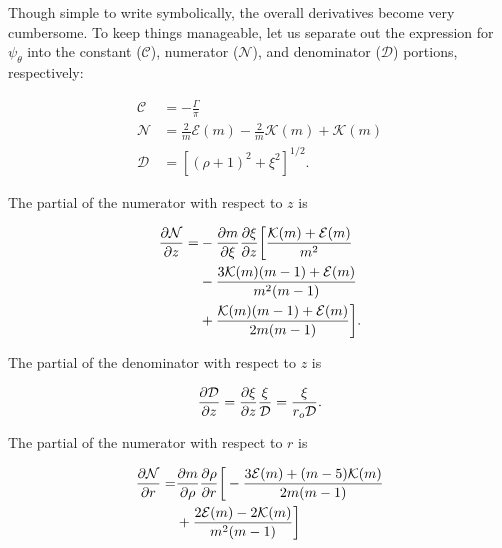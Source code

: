 Though simple to write symbolically, the overall derivatives become very cumbersome.
%
To keep things manageable, let us separate out the expression for \(\psi_\theta\) into the constant (\(\mathcal{C}\)), numerator (\(\mathcal{N}\)), and denominator (\(\mathcal{D}\)) portions, respectively:

\begin{equation}
    \label{eqn:cnd}
\begin{aligned}
    \mathcal{\mathcal{C}} &= -\frac{\Gamma}{\pi } \\
    \mathcal{\mathcal{N}} &= \frac{2}{m}\mathcal{E}(m) - \frac{2}{m}\mathcal{K}(m) + \mathcal{K}(m) \\
    \mathcal{\mathcal{D}} &= \left[(\rho+1)^2+\xi^2\right]^{1/2}.
\end{aligned}
\end{equation}

\noindent The partial of the numerator with respect to \(z\) is

\begin{equation}
    \begin{split}
        \frac{\partial \mathcal{N}}{\partial z} =& -\frac{\partial m}{\partial \xi}\frac{\partial \xi}{\partial z} \bigg[ \frac{\mathcal{K}(m)+\mathcal{E}(m)}{m^2}\\
         &- \frac{3\mathcal{K}(m)(m-1)+\mathcal{E}(m)}{m^2(m-1)}\\
         &+ \frac{\mathcal{K}(m)(m-1)+\mathcal{E}(m)}{2m(m-1)} \bigg].
    \end{split}
\end{equation}

\noindent The partial of the denominator with respect to \(z\) is

\begin{equation}
    \frac{\partial \mathcal{D}}{\partial z} = \frac{\partial \xi}{\partial z} \frac{\xi}{\mathcal{D}} = \frac{\xi}{r_o\mathcal{D}}.
\end{equation}

\noindent The partial of the numerator with respect to \(r\) is

\begin{equation}
    \begin{split}
        \frac{\partial \mathcal{N}}{\partial r} =& \frac{\partial m}{\partial \rho}\frac{\partial \rho}{\partial r} \bigg[ -\frac{3\mathcal{E}(m) + (m-5)\mathcal{K}(m)}{2m(m-1)} \\
         &+ \frac{2\mathcal{E}(m) - 2\mathcal{K}(m)}{m^2(m-1)} \bigg]\\
    \end{split}
\end{equation}

